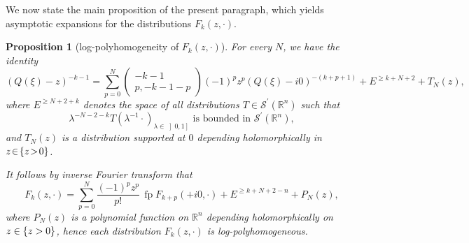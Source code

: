 \documentclass[10pt]{amsart}
\let\pazocal\mathscr
\newtheorem{proposition}[theorem]{Proposition}
\theoremstyle{definition}
\newcommand\rr{{\mathbb R}}
\let\Im\relax
\DeclareMathOperator{\Im}{Im}
\DeclareMathOperator*{\pf}{fp}
\newcommand{\opencl}[1]{\mathopen{}\mathclose{\left]#1 \right]}}
\begin{document}
We now state the main proposition of the present paragraph,
which yields asymptotic expansions for the distributions
$F_k(z,\cdot)$.

\begin{proposition}[log-polyhomogeneity of $F_k(z,\cdot) $]
\label{prop:logpolyF}
For every $N$, we have
the identity
\[
(Q(\xi)-z)^{-k-1}=\sum_{p=0}^N \begin{pmatrix}
-k-1\\
p,-k-1-p
\end{pmatrix} (-1)^pz^{p} (Q(\xi)-i0)^{-(k+p+1)}+E^{\geqslant k+N+2 }+T_N(z),
\]
where $E^{\geqslant N+2+k }$ denotes the space of all distributions $T\in \pazocal{S}^\prime(\rr^n)$ such that
\[
\lambda^{-N-2-k} T(\lambda^{-1}\cdot)_{\lambda\in \opencl{0,1}} \text{ is bounded in } \pazocal{S}^\prime(\rr^n),
\]
and $T_N(z)$ is a distribution supported at $0$ depending holomorphically in \hbox{$z\!\in\!\{\Im z\!>\!0\}$}.

It follows by inverse Fourier transform that
\begin{equation}\label{e:expansionF}
F_k(z,\cdot)=\sum_{p=0}^{N} \frac{(-1)^pz^{p}}{p!}\, {\pf F_{k+p}(+i0,\cdot)}
+E^{\geqslant k+N+2-n }+P_N(z),
\end{equation}
where $P_N(z)$ is a polynomial function on $\mathbb{R}^n$ depending holomorphically on $z\in\{\Im z>0\}$,
hence each distribution $F_k(z,\cdot)$ is log-polyhomogeneous.
\end{proposition}
\end{document}
